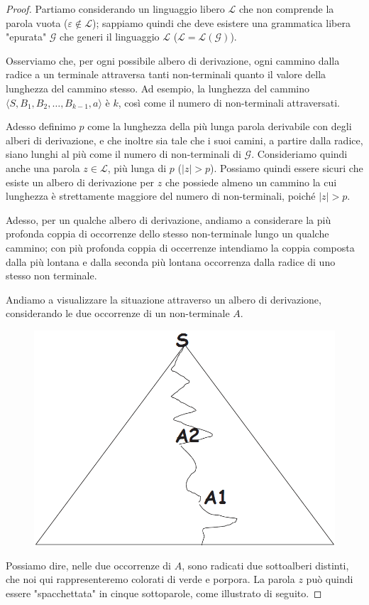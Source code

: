 \documentclass[class=book, crop=false, oneside]{standalone}
\begin{document}
\begin{proof}
  Partiamo considerando un linguaggio libero \(\mathcal{L}\) che non comprende la parola vuota (\(\varepsilon \notin \mathcal{L}\)); sappiamo quindi che deve esistere una grammatica libera "epurata" \(\mathcal{G}\) che generi il linguaggio \(\mathcal{L}\) (\(\mathcal{L} = \mathcal{L(G)}\)).

  Osserviamo che, per ogni possibile albero di derivazione, ogni cammino dalla radice a un terminale attraversa tanti non-terminali quanto il valore della lunghezza del cammino stesso. Ad esempio, la lunghezza del cammino \(\langle S, B_1, B_2, \ldots, B_{k-1}, a \rangle\) è \(k\), così come il numero di non-terminali attraversati.

  Adesso definimo \(p\) come la lunghezza della più lunga parola derivabile con degli alberi di derivazione, e che inoltre sia tale che i suoi camini, a partire dalla radice, siano lunghi al più come il numero di non-terminali di \(\mathcal{G}\). Consideriamo quindi anche una parola \(z \in \mathcal{L}\), più lunga di \(p\) (\(|z| > p\)). Possiamo quindi essere sicuri che esiste un albero di derivazione per \(z\) che possiede almeno un cammino la cui lunghezza è strettamente maggiore del numero di non-terminali, poiché \(|z| >p\).

  Adesso, per un qualche albero di derivazione, andiamo a considerare la più profonda coppia di occorrenze dello stesso non-terminale lungo un qualche cammino; con più profonda coppia di occerrenze intendiamo la coppia composta dalla più lontana e dalla seconda più lontana occorrenza dalla radice di uno stesso non terminale.

  Andiamo a visualizzare la situazione attraverso un albero di derivazione, considerando le due occorrenze di un non-terminale \(A\).

  \begin{figure}
    \centering
    \includegraphics[width=.25\textwidth,keepaspectratio]{pl-proof_1}
  \end{figure}

  Possiamo dire, nelle due occorrenze di \(A\), sono radicati due sottoalberi distinti, che noi qui rappresenteremo colorati di verde e porpora. La parola \(z\) può quindi essere "spacchettata" in cinque sottoparole, come illustrato di seguito.


\end{proof}
\end{document}
